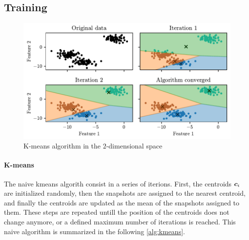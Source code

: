 \subsection{Training}

\begin{figure}[htbp]
  \centering
  \includegraphics[width=\textwidth]{images/Kmeans_vornoi.pdf}
  \caption{K-means algorithm in the $2$-dimensional space}
  \label{fig:kmeans_vornoi}
\end{figure}

\paragraph*{K-means} The naive kmeans algorith consist in a series of iterions. First, the centroids $\bm{c}_i$ are initialized randomly, then the snapshots are assigned to the nearest centroid, and finally the centroids are updated as the mean of the snapshots assigned to them. These steps are repeated untill the position of the centroids does not change anymore, or a defined maximum number of iterations is reached. This naive algorithm is summarized in the following \autoref{alg:kmeans}.

